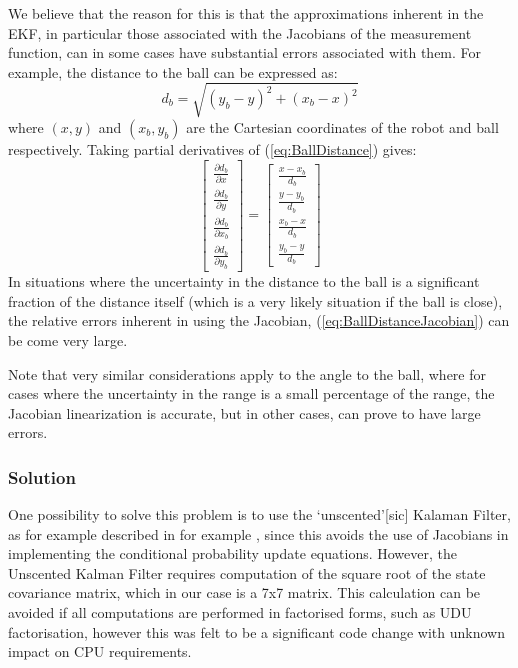 We believe that the reason for this is that the approximations
inherent in the EKF, in particular those associated with the
Jacobians of the measurement function, can in some cases have
substantial errors associated with them. For example, the distance
to the ball can be expressed as:
\begin{equation}\label{eq:BallDistance}
    d_b=\sqrt{(y_b-y)^2+(x_b-x)^2}
\end{equation}
where $(x,y)$ and $(x_b,y_b)$ are the Cartesian coordinates of the
robot and ball respectively. Taking partial derivatives of
(\ref{eq:BallDistance}) gives:
\begin{equation}\label{eq:BallDistanceJacobian}
    \left[\begin{array}{c}
            \frac{\partial d_b}{\partial x} \\
            \frac{\partial d_b}{\partial y}  \\
            \frac{\partial d_b}{\partial x_b}  \\
            \frac{\partial d_b}{\partial y_b}
          \end{array}
    \right] =
\left[\begin{array}{c}
            \frac{x-x_b}{d_b} \\
            \frac{y-y_b}{d_b}   \\
            \frac{x_b-x}{d_b}   \\
            \frac{y_b-y}{d_b}
          \end{array}
    \right]
\end{equation}
In situations where the uncertainty in the distance to the ball is a
significant fraction of the distance itself (which is a very likely
situation if the ball is close), the relative errors inherent in
using the Jacobian, (\ref{eq:BallDistanceJacobian}) can be come very
large.

Note that very similar considerations apply to the angle to the
ball, where for cases where the uncertainty in the range is a small
percentage of the range, the Jacobian linearization is accurate, but
in other cases, can prove to have large errors.

\subsubsection{Solution}

One possibility to solve this problem is to use the `unscented'[sic]
Kalaman Filter, as for example described in for example
\cite{Wan2000}, since this avoids the use of Jacobians in
implementing the conditional probability update equations. However,
the Unscented Kalman Filter requires computation of the square root
of the state covariance matrix, which in our case is a 7x7 matrix.
This calculation can be avoided if all computations are performed in
factorised forms, such as UDU factorisation, however this was felt
to be a significant code change with unknown impact on CPU
requirements.

